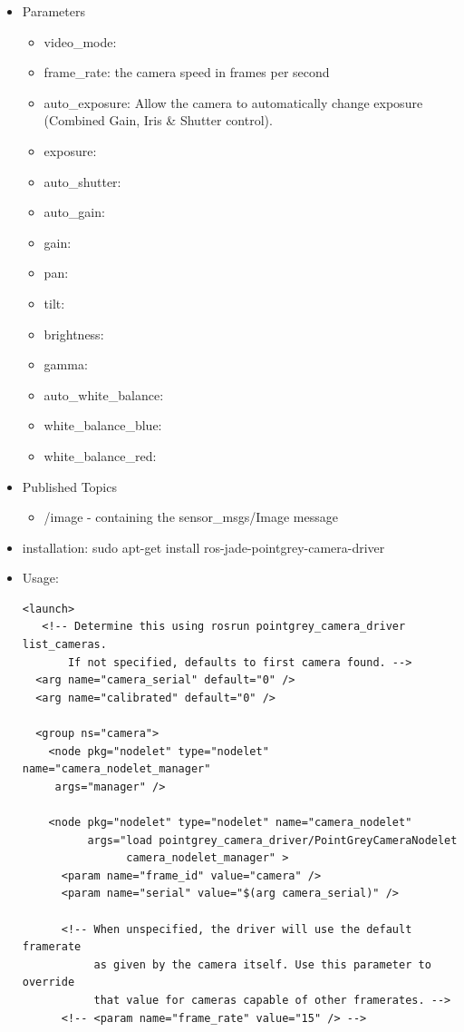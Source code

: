 \begin{itemize}
\item Parameters
\begin{itemize}
\item video\_mode:
\item frame\_rate:  the camera speed in frames per second
\item auto\_exposure:  Allow the camera to automatically change exposure (Combined Gain, Iris \& Shutter control).
\item exposure: 
\item auto\_shutter:
\item auto\_gain:
\item gain:
\item pan:
\item tilt:
\item brightness:
\item gamma:
\item auto\_white\_balance:
\item white\_balance\_blue:
\item white\_balance\_red:
\end{itemize}
\item Published Topics
\begin{itemize}
\item /image - containing the sensor\_msgs/Image message
\end{itemize}
\item installation: sudo apt-get install ros-jade-pointgrey-camera-driver
\item Usage:
\lstset{language=XML}
\begin{lstlisting}
<launch>
   <!-- Determine this using rosrun pointgrey_camera_driver list_cameras.
       If not specified, defaults to first camera found. -->
  <arg name="camera_serial" default="0" />
  <arg name="calibrated" default="0" />

  <group ns="camera">
    <node pkg="nodelet" type="nodelet" name="camera_nodelet_manager" 
     args="manager" />

    <node pkg="nodelet" type="nodelet" name="camera_nodelet"
          args="load pointgrey_camera_driver/PointGreyCameraNodelet 
                camera_nodelet_manager" >
      <param name="frame_id" value="camera" />
      <param name="serial" value="$(arg camera_serial)" />

      <!-- When unspecified, the driver will use the default framerate 
           as given by the camera itself. Use this parameter to override
           that value for cameras capable of other framerates. -->
      <!-- <param name="frame_rate" value="15" /> -->
      

\end{lstlisting}
\end{itemize}
